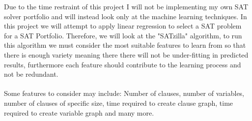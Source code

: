 \documentclass[12pt,a4paper]{article}
\begin{document}
Due to the time restraint of this project I will not be implementing my own SAT solver portfolio and will instead look only at the machine learning techniques. In this project we will attempt to apply linear regression to select a SAT problem for a SAT Portfolio. Therefore, we will look at the "SATzilla"\cite{satzilla} algorithm, to run this algorithm we must consider the most suitable features to learn from so that there is enough variety meaning there there will not be under-fitting in predicted results, furthermore each feature should contribute to the learning process and not be redundant. \\\\ 
Some features \cite{machineLearningFeatures} to consider may include: Number of clauses, number of variables, number of clauses of specific size, time required to create clause graph, time required to create variable graph and many more.\\\\
\end{document}
